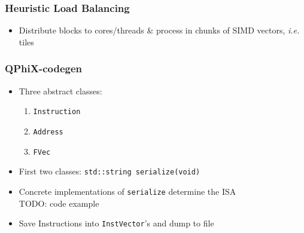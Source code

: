 \documentclass{beamer}
\begin{document}
\begin{frame}
\begin{columns}
\begin{column}{.5\textwidth}
\begin{center}
        \end{center}
      \end{column}

    \end{columns}

  \end{frame}


  \begin{frame}
    \frametitle{Heuristic Load Balancing}

    \begin{itemize}
      \item Distribute blocks to cores/threads \& process in chunks
        of SIMD vectors, \textit{i.e.} tiles
        \vfill
    \end{itemize}

  \end{frame}


  \begin{frame}
    \frametitle{QPhiX-codegen}

    \begin{itemize}

      \item Three abstract classes:
        \begin{enumerate}
          \item \texttt{Instruction}
          \item \texttt{Address}
          \item \texttt{FVec}
        \end{enumerate}
        \vfill

      \item First two classes: \;\; \texttt{std::string serialize(void)}
        \vfill

      \item Concrete implementations of \texttt{serialize} determine the ISA\\
        TODO: code example
        \vfill

      \item Save Instructions into \texttt{InstVector}'s and dump to file

    \end{itemize}

  \end{frame}
\end{document}
